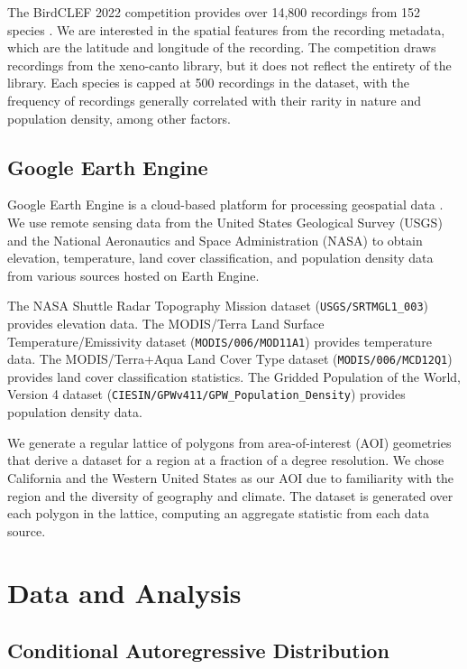 \documentclass[notitlepage]{article}
\begin{document}
The BirdCLEF 2022 competition provides over 14,800 recordings from 152 species \cite{kahl2022overview}.
We are interested in the spatial features from the recording metadata, which are the latitude and longitude of the recording.
The competition draws recordings from the xeno-canto library, but it does not reflect the entirety of the library.
Each species is capped at 500 recordings in the dataset, with the frequency of recordings generally correlated with their rarity in nature and population density, among other factors.

\subsection{Google Earth Engine}

Google Earth Engine is a cloud-based platform for processing geospatial data \cite{gorelick_google_2017}.
We use remote sensing data from the United States Geological Survey (USGS) and the National Aeronautics and Space Administration (NASA) to obtain elevation, temperature, land cover classification, and population density data from various sources hosted on Earth Engine.

The NASA Shuttle Radar Topography Mission dataset (\texttt{USGS/SRTMGL1\_003}) \cite{nasa_srtmg} provides elevation data.
The MODIS/Terra Land Surface Temperature/Emissivity dataset (\texttt{MODIS/006/MOD11A1}) \cite{wan_zhengming_mod11a1_2015} provides temperature data.
The MODIS/Terra+Aqua Land Cover Type dataset (\texttt{MODIS/006/MCD12Q1}) \cite{friedl_mark_mcd12q1_2019} provides land cover classification statistics.
The Gridded Population of the World, Version 4 dataset (\texttt{CIESIN/GPWv411/GPW\_Population\_Density}) \cite{gpwv4} provides population density data.

We generate a regular lattice of polygons from area-of-interest (AOI) geometries that derive a dataset for a region at a fraction of a degree resolution.
We chose California and the Western United States as our AOI due to familiarity with the region and the diversity of geography and climate.
The dataset is generated over each polygon in the lattice, computing an aggregate statistic from each data source.

\section{Data and Analysis}

\subsection{Conditional Autoregressive Distribution}
\end{document}
